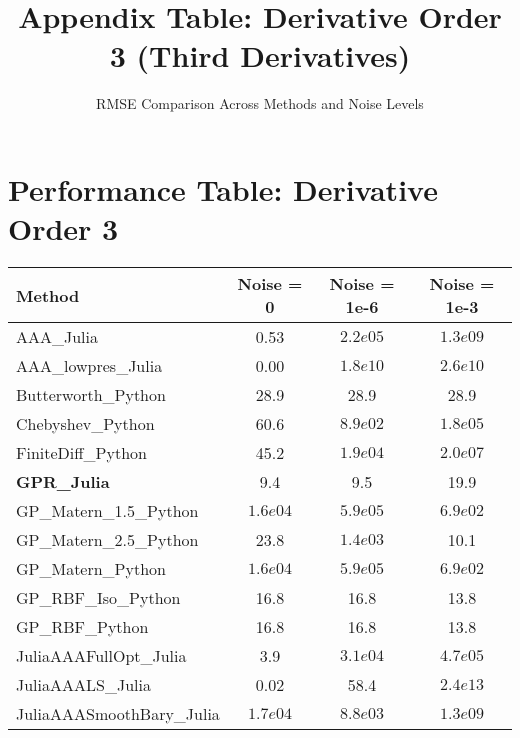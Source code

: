\documentclass[11pt]{article}
\begin{document}
\title{Appendix Table: Derivative Order 3 (Third Derivatives)}
\author{RMSE Comparison Across Methods and Noise Levels}
\date{}
\maketitle

\section{Performance Table: Derivative Order 3}

\begin{center}
\begin{tabular}{@{}l|ccc@{}}
\toprule
\textbf{Method} & \textbf{Noise = 0} & \textbf{Noise = 1e-6} & \textbf{Noise = 1e-3} \\
\midrule
AAA\_Julia & \textcolor{successgreen}{0.53} & \textcolor{errorred}{$2.2e05$} & \textcolor{errorred}{$1.3e09$} \\
AAA\_lowpres\_Julia & \textcolor{successgreen}{0.00} & \textcolor{errorred}{$1.8e10$} & \textcolor{errorred}{$2.6e10$} \\
Butterworth\_Python & 28.9 & 28.9 & 28.9 \\
Chebyshev\_Python & 60.6 & $8.9e02$ & \textcolor{errorred}{$1.8e05$} \\
FiniteDiff\_Python & 45.2 & \textcolor{errorred}{$1.9e04$} & \textcolor{errorred}{$2.0e07$} \\
\textbf{GPR\_Julia} & \textcolor{successgreen}{9.4} & \textcolor{successgreen}{9.5} & 19.9 \\
GP\_Matern\_1.5\_Python & \textcolor{errorred}{$1.6e04$} & \textcolor{errorred}{$5.9e05$} & $6.9e02$ \\
GP\_Matern\_2.5\_Python & 23.8 & \textcolor{errorred}{$1.4e03$} & 10.1 \\
GP\_Matern\_Python & \textcolor{errorred}{$1.6e04$} & \textcolor{errorred}{$5.9e05$} & $6.9e02$ \\
GP\_RBF\_Iso\_Python & 16.8 & 16.8 & 13.8 \\
GP\_RBF\_Python & 16.8 & 16.8 & 13.8 \\
JuliaAAAFullOpt\_Julia & \textcolor{successgreen}{3.9} & \textcolor{errorred}{$3.1e04$} & \textcolor{errorred}{$4.7e05$} \\
JuliaAAALS\_Julia & \textcolor{successgreen}{0.02} & 58.4 & \textcolor{errorred}{$2.4e13$} \\
JuliaAAASmoothBary\_Julia & \textcolor{errorred}{$1.7e04$} & \textcolor{errorred}{$8.8e03$} & \textcolor{errorred}{$1.3e09$} \\

\end{tabular}
\end{center}
\end{document}
